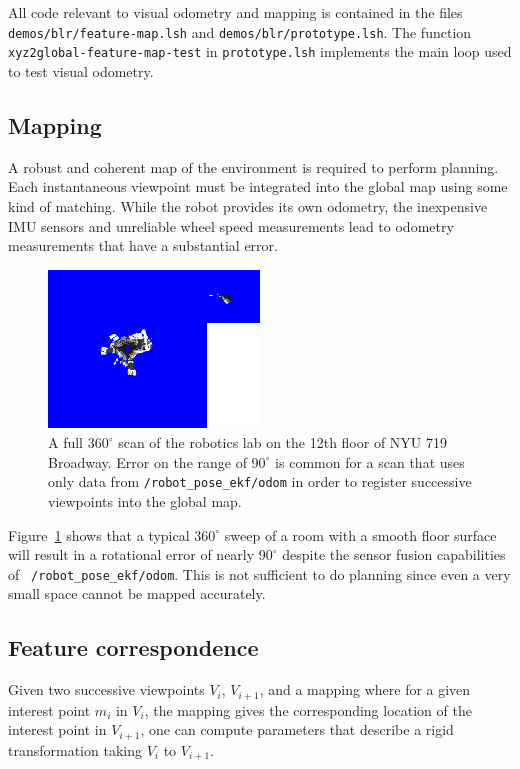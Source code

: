 \documentclass[letterpaper]{article}%
\begin{document}
All code relevant to visual odometry and mapping is contained in the files {\tt
demos/blr/feature-map.lsh} and {\tt demos/blr/prototype.lsh}. The function
{\tt xyz2global-feature-map-test} in {\tt prototype.lsh} implements the main
loop used to test visual odometry.

\subsection{Mapping}
A robust and coherent map of the environment is required to perform planning.
Each instantaneous viewpoint must be integrated into the global map using some
kind of matching. While the robot provides its own odometry, the inexpensive
IMU sensors and unreliable wheel speed measurements lead to odometry
measurements that have a substantial error. 

\begin{figure}
  \centering
  \includegraphics[width=0.5\textwidth]{lab_scans/lab_scan_odom_only_03.png}
  \caption{A full $360^{\circ}$ scan of the robotics lab on the 12th floor of
  NYU 719 Broadway. Error on the range of $90^{\circ}$ is common for a scan
  that uses only data from {\tt /robot\_pose\_ekf/odom} in order to register
  successive viewpoints into the global map.}
  \label{fig:lab_scan_odom_only}
\end{figure}

Figure~\ref{fig:lab_scan_odom_only} shows that a typical $360^{\circ}$ sweep of
a room with a smooth floor surface will result in a rotational error of nearly
$90^{\circ}$ despite the sensor fusion capabilities of {\tt
/robot\_pose\_ekf/odom}. This is not sufficient to do planning since even a
very small space cannot be mapped accurately.

\subsection{Feature correspondence}
Given two successive viewpoints $V_i$, $V_{i+1}$, and a mapping where for a
given interest point $m_i$ in $V_i$, the mapping gives the corresponding
location of the interest point in $V_{i+1}$, one can compute parameters that
describe a rigid transformation taking $V_i$ to $V_{i+1}$.
\end{document}
